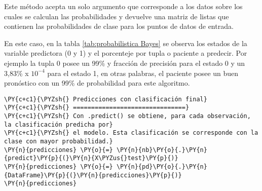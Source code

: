     Este método acepta un solo argumento que corresponde a los datos sobre los cuales se calculan las probabilidades y devuelve una matriz de listas que contienen las probabilidades de clase para los puntos de datos de entrada. 
\par En este caso, en la tabla \ref{tab:probabilistica Bayes} se observa los estados de la variable predictora (0 y 1) y el porcenteje por tupla o paciente a predecir. Por ejemplo la tupla 0 posee un 99\% y fracción de precisión para el estado 0 y un 3,83\% x $10^{-4}$ para el estado 1, en otras palabras, el paciente posee un buen pronóstico con un 99\% de probabilidad para este algoritmo.

    \begin{tcolorbox}[breakable, size=fbox, boxrule=1pt, pad at break*=1mm,colback=cellbackground, colframe=cellborder]
\begin{Verbatim}[commandchars=\\\{\}]
\PY{c+c1}{\PYZsh{} Predicciones con clasificación final}
\PY{c+c1}{\PYZsh{} ===============================}
\PY{c+c1}{\PYZsh{} Con .predict() se obtiene, para cada observación, la clasificación predicha por}
\PY{c+c1}{\PYZsh{} el modelo. Esta clasificación se corresponde con la clase con mayor probabilidad.}
\PY{n}{predicciones} \PY{o}{=} \PY{n}{nb}\PY{o}{.}\PY{n}{predict}\PY{p}{(}\PY{n}{X\PYZus{}test}\PY{p}{)}
\PY{n}{predicciones} \PY{o}{=} \PY{n}{pd}\PY{o}{.}\PY{n}{DataFrame}\PY{p}{(}\PY{n}{predicciones}\PY{p}{)}
\PY{n}{predicciones}
\end{Verbatim}
\end{tcolorbox}

\begin{table}[H]
\centering
\setlength{\tabcolsep}{10pt}
\caption{Predicciones probabilísticas con clasificación final Bayes}
\label{tab:clasificacion bayes}
\end{table}
        
